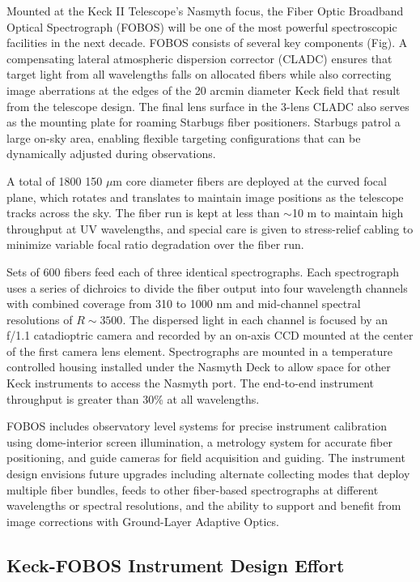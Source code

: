 \documentclass[oneside,11pt]{amsart}
\newcommand{\comment}[2][todo]{{\color{#1}[[{\bf #2}]]}}
\begin{document}
Mounted at the Keck II Telescope's Nasmyth focus, the Fiber Optic Broadband Optical Spectrograph (FOBOS) will be one of
the most powerful spectroscopic facilities in the next decade.  FOBOS consists of several key components (Fig).  A
compensating lateral atmospheric dispersion corrector (CLADC) ensures that target light from all wavelengths falls on
allocated fibers while also correcting image aberrations at the edges of the 20 arcmin diameter Keck field that result
from the telescope design.  The final lens surface in the 3-lens CLADC also serves as the mounting plate for roaming
Starbugs fiber positioners.  Starbugs patrol a large on-sky area, enabling flexible targeting configurations that can
be dynamically adjusted during observations.

A total of 1800 150 $\mu$m core diameter fibers are deployed at the curved focal plane, which rotates and translates to
maintain image positions as the telescope tracks across the sky.  The fiber run is kept at less than $\sim$10 m to
maintain high throughput at UV wavelengths, and special care is given to stress-relief cabling to minimize variable
focal ratio degradation over the fiber run.

Sets of 600 fibers feed each of three identical spectrographs.  Each spectrograph uses a series of dichroics to divide
the fiber output into four wavelength channels with combined coverage from 310 to 1000 nm and mid-channel spectral
resolutions of $R \sim 3500$.  The dispersed light in each channel is focused by an f/1.1 catadioptric camera and
recorded by an on-axis CCD mounted at the center of the first camera lens element.  Spectrographs are mounted in a
temperature controlled housing installed under the Nasmyth Deck to allow space for other Keck instruments to access the
Nasmyth port.  The end-to-end instrument throughput is greater than 30\% at all wavelengths.

FOBOS includes observatory level systems for precise instrument calibration using dome-interior screen illumination, a
metrology system for accurate fiber positioning, and guide cameras for field acquisition and guiding.  The instrument
design envisions future upgrades including alternate collecting modes that deploy multiple fiber bundles, feeds to
other fiber-based spectrographs at different wavelengths or spectral resolutions, and the ability to support and
benefit from image corrections with Ground-Layer Adaptive Optics.



\subsection{Keck-FOBOS Instrument Design Effort}
\label{sec:design}
\noindent \comment{1 page}
\end{document}
